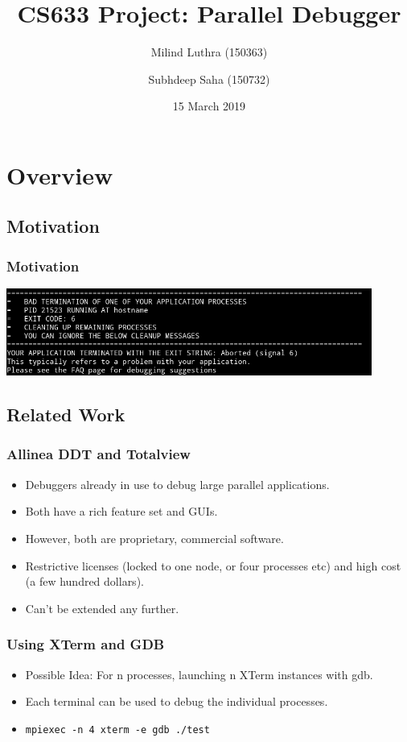 \documentclass{beamer}
\title{CS633 Project: Parallel Debugger}
\author[Milind, Subhdeep]{Milind Luthra (150363) \and Subhdeep Saha (150732)}
\date{15 March 2019}
\begin{document}
\frame{\titlepage}

\section{Overview}

\subsection{Motivation}
\begin{frame}
  \frametitle{Motivation}
  \begin{center}
      \includegraphics[width=0.9\textwidth]{motivation}
  \end{center}
\end{frame}

\subsection{Related Work}

\begin{frame}
  \frametitle{Allinea DDT and Totalview}
  \begin{itemize}
  \item <1-> Debuggers already in use to debug large parallel applications.
  \item <2-> Both have a rich feature set and GUIs.
  \item <3-> However, both are proprietary, commercial software.
  \item <5-> Restrictive licenses (locked to one node, or four processes etc) and high cost (a few hundred dollars).
  \item <6-> Can't be extended any further.
  \end{itemize}
\end{frame}

\begin{frame}[fragile]
  \frametitle{Using XTerm and GDB}
  \begin{itemize}
  \item <1-> Possible Idea: For n processes, launching n XTerm instances with gdb.
  \item <2-> Each terminal can be used to debug the individual processes.
  \item <3-> \texttt{mpiexec -n 4 xterm -e gdb ./test}
  \end{itemize}
\end{frame}
\end{document}
